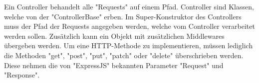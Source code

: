\label{sec:controller}

Ein Controller behandelt alle "Requests" auf einem Pfad. 
Controller sind Klassen, welche von der "ControllerBase" erben. Im Super-Konstruktor des Controllers muss der Pfad der Requests angegeben werden, welche vom Controller verarbeitet werden sollen. Zusätzlich kann ein Objekt mit zusätzlichen Middlewares übergeben werden. Um eine HTTP-Methode zu implementieren, müssen lediglich die Methoden "get", "post", "put", "patch" oder "delete" überschrieben werden. Diese nehmen die von "ExpressJS" bekannten Parameter "Request" und "Response". 
